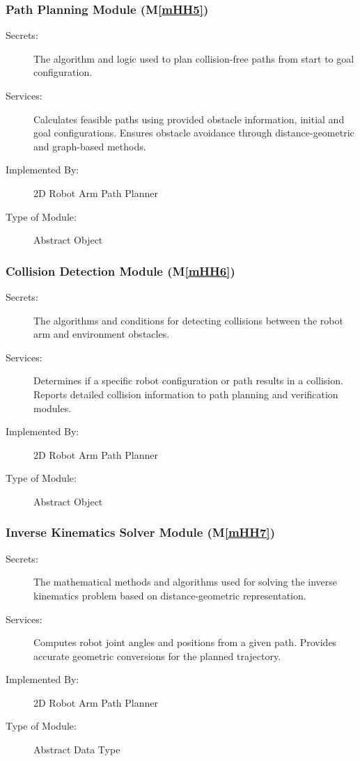 \documentclass[12pt, titlepage]{article}
\newcommand{\mref}[1]{M\ref{#1}}
\begin{document}
\subsubsection{Path Planning Module (\mref{mHH5})}

\begin{description}
\item[Secrets:] The algorithm and logic used to plan collision-free paths from start to goal configuration.
\item[Services:] Calculates feasible paths using provided obstacle information, initial and goal configurations. Ensures obstacle avoidance through distance-geometric and graph-based methods.
\item[Implemented By:] 2D Robot Arm Path Planner
\item[Type of Module:] Abstract Object
\end{description}

\subsubsection{Collision Detection Module (\mref{mHH6})}

\begin{description}
\item[Secrets:] The algorithms and conditions for detecting collisions between the robot arm and environment obstacles.
\item[Services:] Determines if a specific robot configuration or path results in a collision. Reports detailed collision information to path planning and verification modules.
\item[Implemented By:] 2D Robot Arm Path Planner
\item[Type of Module:] Abstract Object
\end{description}

\subsubsection{Inverse Kinematics Solver Module (\mref{mHH7})}

\begin{description}
\item[Secrets:] The mathematical methods and algorithms used for solving the inverse kinematics problem based on distance-geometric representation.
\item[Services:] Computes robot joint angles and positions from a given path. Provides accurate geometric conversions for the planned trajectory.
\item[Implemented By:] 2D Robot Arm Path Planner
\item[Type of Module:] Abstract Data Type
\end{description}
\end{document}
